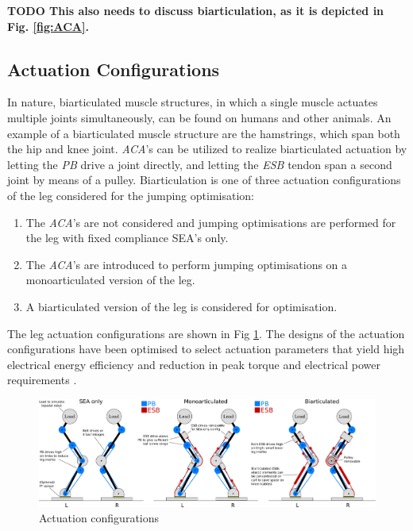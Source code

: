 \documentclass[letterpaper, 10 pt, conference]{ieeeconf}  %
\begin{document}
 \textbf{TODO This also needs to discuss biarticulation, as it is depicted in Fig. \ref{fig:ACA}.}

\subsection{Actuation Configurations}
In nature, biarticulated muscle structures, in which a single muscle actuates multiple joints simultaneously, can be found on humans and other animals. An example of a biarticulated muscle structure are the hamstrings, which span both the hip and knee joint. \textit{ACA}'s can be utilized to realize biarticulated actuation by letting the \textit{PB} drive a joint directly, and letting the \textit{ESB} tendon span a second joint by means of a pulley. Biarticulation is one of three actuation configurations of the leg considered for the jumping optimisation:

\begin{enumerate}
	\item The \textit{ACA}'s are not considered and jumping optimisations are performed for the leg with fixed compliance SEA's only.
	\item The \textit{ACA}'s are introduced to perform jumping optimisations on a monoarticulated version of the leg. 
	\item A biarticulated version of the leg is considered for optimisation.
\end{enumerate}

The leg actuation configurations are shown in Fig \ref{fig:configurations}. The designs of the actuation configurations have been optimised to select actuation
parameters that yield high electrical energy efficiency and reduction in peak torque and electrical power requirements \cite{roozing2016design}.


\begin{figure}[ht]
	\centering
	\includegraphics[width=\linewidth]{3-DoF_leg_concept}
	\caption{Actuation configurations}
	\label{fig:configurations}
\end{figure}
\end{document}
